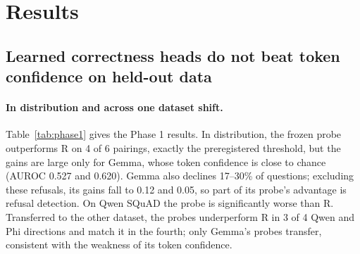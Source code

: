 \documentclass[10pt]{article}
\begin{document}
\section{Results}

\subsection{Learned correctness heads do not beat token confidence on held-out data}
\label{sec:correctness}

\paragraph{In distribution and across one dataset shift.} Table~\ref{tab:phase1} gives the Phase 1 results. In distribution, the frozen probe outperforms R on 4 of 6 pairings, exactly the preregistered threshold, but the gains are large only for Gemma, whose token confidence is close to chance (AUROC 0.527 and 0.620). Gemma also declines 17--30\% of questions; excluding these refusals, its gains fall to 0.12 and 0.05, so part of its probe's advantage is refusal detection. On Qwen SQuAD the probe is significantly worse than R. Transferred to the other dataset, the probes underperform R in 3 of 4 Qwen and Phi directions and match it in the fourth; only Gemma's probes transfer, consistent with the weakness of its token confidence.
\end{document}
